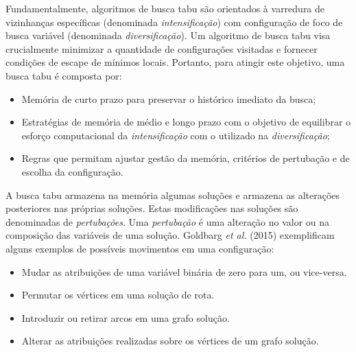 Fundamentalmente, algoritmos de busca tabu são orientados à varredura de vizinhanças específicas (denominada \emph{intensificação}) com configuração de foco de busca variável (denominada \emph{diversificação}). Um algoritmo de busca tabu visa crucialmente minimizar a quantidade de configurações visitadas e fornecer condições de escape de mínimos locais. Portanto, para atingir este objetivo, uma busca tabu é composta por:

\begin{itemize}
    \item Memória de curto prazo para preservar o histórico imediato da busca;
    \item Estratégias de memória de médio e longo prazo com o objetivo de equilibrar o esforço computacional da \emph{intensificação} com o utilizado na \emph{diversificação};
    \item Regras que permitam ajustar gestão da memória, critérios de pertubação e de escolha da configuração.
\end{itemize}

A busca tabu armazena na memória algumas soluções e armazena as alterações posteriores nas próprias soluções. Estas modificações nas soluções são denominadas de \emph{pertubações}. Uma \emph{pertubação} é uma alteração no valor ou na composição das variáveis de uma solução. Goldbarg \emph{et al.} (2015) exemplificam alguns exemplos de possíveis movimentos em uma configuração:

\begin{itemize}
    \item Mudar as atribuições de uma variável binária de zero para um, ou vice-versa.
    \item Permutar os vértices em uma solução de rota.
    \item Introduzir ou retirar arcos em uma grafo solução.
    \item Alterar as atribuições realizadas sobre os vértices de um grafo solução.
\end{itemize}

